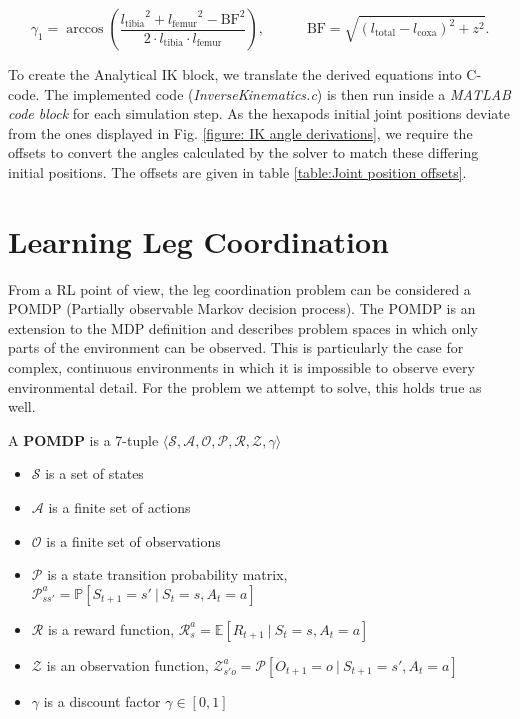 \[
	\gamma_1 = \arccos(\frac{{l_\text{tibia}}^2 + {l_\text{femur}}^2 - {\text{BF}}^2}  {2 \cdot {l_\text{tibia}} \cdot {l_\text{femur}}}) ,\quad \quad \quad \text{BF} = \sqrt{(l_\text{total} - l_\text{coxa})^2 + z^2}.
\]

To create the Analytical IK block, we translate the derived equations into C-code.
The implemented code (\textit{InverseKinematics.c}) is then run inside a \textit{MATLAB code block} for each simulation step.
As the hexapods initial joint positions deviate from the ones displayed in Fig. \ref{figure: IK angle derivations}, we require the offsets to convert the angles calculated by the solver to match these differing initial positions.
The offsets are given in table \ref{table:Joint position offsets}.


\section{Learning Leg Coordination} \label{sec: RL setup}
From a RL point of view, the leg coordination problem can be considered a POMDP (Partially observable Markov decision process).
The POMDP is an extension to the MDP definition and describes problem spaces in which only parts of the environment can be observed.
This is particularly the case for complex, continuous environments in which it is impossible to observe every environmental detail.
For the problem we attempt to solve, this holds true as well.

\begin{definition}
	A \textbf{POMDP} is a 7-tuple $\langle \mathcal{S,A,O,P,R,Z,\gamma} \rangle$
	\begin{itemize}
		\item $\mathcal{S}$ is a set of states
		\item $\mathcal{A}$ is a finite set of actions
		\item $\mathcal{O}$ is a finite set of observations
		\item $\mathcal{P}$ is a state transition probability matrix, $\mathcal{P}_{ss'}^a = \mathbb{P}[S_{t+1} = s' \ | \ S_t = s, A_t = a	] $
		\item $\mathcal{R}$ is a reward function, $\mathcal{R}_s^a = \mathbb{E}[R_{t+1} \ | \ S_t = s, A_t = a]$
		\item $\mathcal{Z}$ is an observation function, $\mathcal{Z}_{s'o}^a = \mathcal{P}[O_{t+1} = o \ | \ S_{t+1} = s', A_t = a]$
		\item $\mathcal{\gamma}$ is a discount factor $\mathcal{\gamma} \in [0,1]$
	\end{itemize}
\end{definition}

